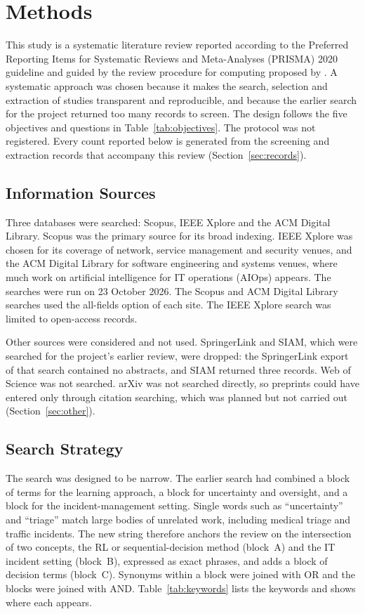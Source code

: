 \documentclass[pdflatex,sn-basic]{sn-jnl}
\begin{document}
\section{Methods}
\label{sec:method}

This study is a systematic literature review reported according to the Preferred Reporting Items for Systematic Reviews and Meta-Analyses (PRISMA) 2020 guideline \citep{page2021} and guided by the review procedure for computing proposed by \citet{kitchenham2007}. A systematic approach was chosen because it makes the search, selection and extraction of studies transparent and reproducible, and because the earlier search for the project returned too many records to screen. The design follows the five objectives and questions in Table~\ref{tab:objectives}. The protocol was not registered. Every count reported below is generated from the screening and extraction records that accompany this review (Section~\ref{sec:records}).

\subsection{Information Sources}

Three databases were searched: Scopus, IEEE Xplore and the ACM Digital Library. Scopus was the primary source for its broad indexing. IEEE Xplore was chosen for its coverage of network, service management and security venues, and the ACM Digital Library for software engineering and systems venues, where much work on artificial intelligence for IT operations (AIOps) appears. The searches were run on 23 October 2026. The Scopus and ACM Digital Library searches used the all-fields option of each site. The IEEE Xplore search was limited to open-access records.

Other sources were considered and not used. SpringerLink and SIAM, which were searched for the project's earlier review, were dropped: the SpringerLink export of that search contained no abstracts, and SIAM returned three records. Web of Science was not searched. arXiv was not searched directly, so preprints could have entered only through citation searching, which was planned but not carried out (Section~\ref{sec:other}).

\subsection{Search Strategy}

The search was designed to be narrow. The earlier search had combined a block of terms for the learning approach, a block for uncertainty and oversight, and a block for the incident-management setting. Single words such as ``uncertainty'' and ``triage'' match large bodies of unrelated work, including medical triage and traffic incidents. The new string therefore anchors the review on the intersection of two concepts, the RL or sequential-decision method (block~A) and the IT incident setting (block~B), expressed as exact phrases, and adds a block of decision terms (block~C). Synonyms within a block were joined with OR and the blocks were joined with AND. Table~\ref{tab:keywords} lists the keywords and shows where each appears.
\end{document}

